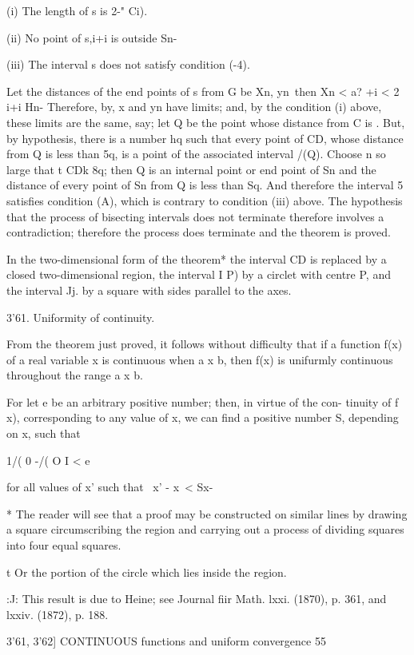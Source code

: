 (i) The length of s is 2-" Ci).

(ii) No point of s,i+i is outside Sn-

(iii) The interval s does not satisfy condition (-4).

Let the distances of the end points of s from G be Xn, yn\ then Xn <
a? +i < 2 i+i Hn- Therefore, by, x and yn have limits; and, by
the condition (i) above, these limits are the same, say; let Q be the
point whose distance from C is . But, by hypothesis, there is a number
hq such that every point of CD, whose distance from Q is less than 5q,
is a point of the associated interval /(Q). Choose n so large that t
CDk 8q; then Q is an internal point or end point of Sn and the
distance of every point of Sn from Q is less than Sq. And therefore
the interval 5 satisfies condition (A), which is contrary to condition
(iii) above. The hypothesis that the process of bisecting intervals
does not terminate therefore involves a contradiction; therefore the
process does terminate and the theorem is proved.

In the two-dimensional form of the theorem* the interval CD is
replaced by a closed two-dimensional region, the interval I P) by a
circlet with centre P, and the interval Jj. by a square with sides
parallel to the axes.

3'61. Uniformity of continuity.

From the theorem just proved, it follows without difficulty that if a
function f(x) of a real variable x is continuous when a x b, then f(x)
is unifurmly continuous throughout the range a x b.

For let e be an arbitrary positive number; then, in virtue of the
con- tinuity of f x), corresponding to any value of x, we can find a
positive number S, depending on x, such that

1/( 0 -/( O I < e

for all values of x' such that \ x' - x\ < Sx-

* The reader will see that a proof may be constructed on similar lines
by drawing a square circumscribing the region and carrying out a
process of dividing squares into four equal squares.

t Or the portion of the circle which lies inside the region.

:J: This result is due to Heine; see Journal fiir Math. lxxi. (1870),
p. 361, and lxxiv. (1872), p. 188.

3'61, 3'62] CONTINUOUS functions and uniform convergence 55

